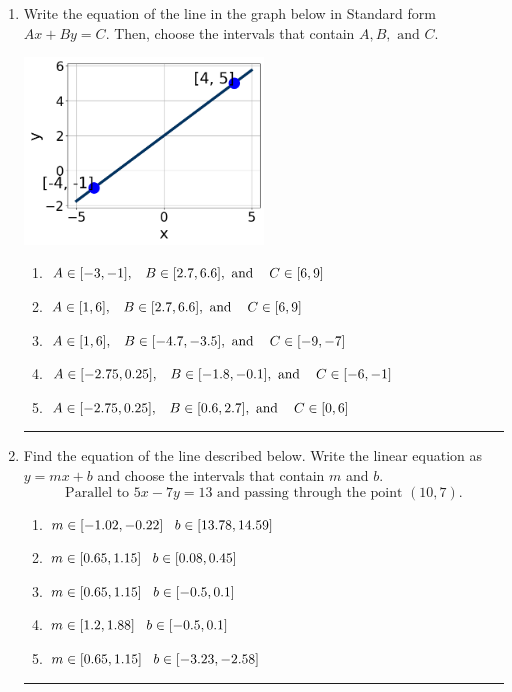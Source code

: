 \documentclass[14pt]{extbook}
\newcommand{\litem}[1]{\item#1\hspace*{-1cm}\rule{\textwidth}{0.4pt}}
\begin{document}
\begin{enumerate}
{\begin{enumerate}[label=\Alph*.]
\end{enumerate} }
\litem{
Write the equation of the line in the graph below in Standard form $Ax+By=C$. Then, choose the intervals that contain $A, B, \text{ and } C$.
\begin{center}
    \includegraphics[width=0.5\textwidth]{../Figures/linearGraphToStandardC.png}
\end{center}
\begin{enumerate}[label=\Alph*.]
\item \( A \in [-3, -1], \hspace{3mm} B \in [2.7, 6.6], \text{ and } \hspace{3mm} C \in [6, 9] \)
\item \( A \in [1, 6], \hspace{3mm} B \in [2.7, 6.6], \text{ and } \hspace{3mm} C \in [6, 9] \)
\item \( A \in [1, 6], \hspace{3mm} B \in [-4.7, -3.5], \text{ and } \hspace{3mm} C \in [-9, -7] \)
\item \( A \in [-2.75, 0.25], \hspace{3mm} B \in [-1.8, -0.1], \text{ and } \hspace{3mm} C \in [-6, -1] \)
\item \( A \in [-2.75, 0.25], \hspace{3mm} B \in [0.6, 2.7], \text{ and } \hspace{3mm} C \in [0, 6] \)

\end{enumerate} }
\litem{
Find the equation of the line described below. Write the linear equation as $ y=mx+b $ and choose the intervals that contain $m$ and $b$.\[ \text{Parallel to } 5 x - 7 y = 13 \text{ and passing through the point } (10, 7). \]\begin{enumerate}[label=\Alph*.]
\item \( m \in [-1.02, -0.22] \hspace*{3mm} b \in [13.78, 14.59] \)
\item \( m \in [0.65, 1.15] \hspace*{3mm} b \in [0.08, 0.45] \)
\item \( m \in [0.65, 1.15] \hspace*{3mm} b \in [-0.5, 0.1] \)
\item \( m \in [1.2, 1.88] \hspace*{3mm} b \in [-0.5, 0.1] \)
\item \( m \in [0.65, 1.15] \hspace*{3mm} b \in [-3.23, -2.58] \)


\end{enumerate}}
\end{enumerate}
\end{document}
